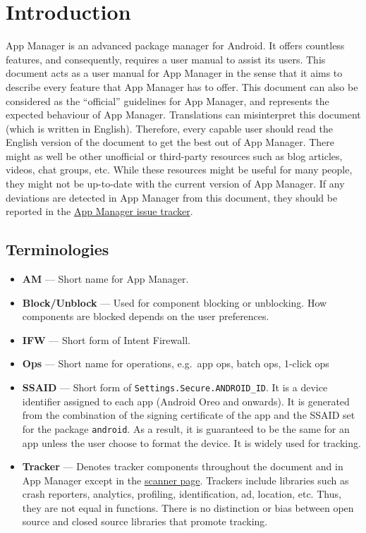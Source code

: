 \chapter{Introduction}\label{ch:introduction} %
App Manager is an advanced package manager for Android. It offers countless features, and consequently, requires a user
manual to assist its users. This document acts as a user manual for App Manager in the sense that it aims to describe
every feature that App Manager has to offer. This document can also be considered as the ``official'' guidelines for
App Manager, and represents the expected behaviour of App Manager. Translations can misinterpret this document (which is
written in English). Therefore, every capable user should read the English version of the document to get the best out
of App Manager. There might as well be other unofficial or third-party resources such as blog articles, videos, chat
groups, etc. While these resources might be useful for many people, they might not be up-to-date with the current
version of App Manager. If any deviations are detected in App Manager from this document, they should be reported in the
\href{https://github.com/MuntashirAkon/AppManager/issues}{App Manager issue tracker}.


\section{Terminologies}\label{sec:terminologies} %
\begin{itemize}
    \item \textbf{AM} --- Short name for App Manager.
    \item \textbf{Block/Unblock} --- Used for component blocking or unblocking. How components are blocked depends on
    the user preferences.
    \item \textbf{IFW} --- Short form of Intent Firewall.
    \item \textbf{Ops} --- Short name for operations, e.g.\ app ops, batch ops, 1-click ops
    \item \textbf{SSAID} --- Short form of \texttt{Settings.Secure.ANDROID\_ID}. It is a device identifier assigned to
    each app (Android Oreo and onwards). It is generated from the combination of the signing certificate of the app
    and the SSAID set for the package \texttt{android}. As a result, it is guaranteed to be the same for an app unless
    the user choose to format the device. It is widely used for tracking.
    \item \textbf{Tracker} --- Denotes tracker components throughout the document and in App Manager except in the
    \hyperref[sec:scanner-page]{scanner page}. Trackers include libraries such as crash reporters, analytics,
    profiling, identification, ad, location, etc. Thus, they are not equal in functions. There is no distinction or bias
    between open source and closed source libraries that promote tracking.
\end{itemize}


